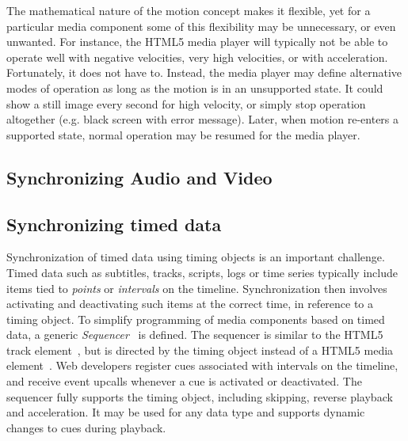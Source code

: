 \label{sec:toomuch}

The mathematical nature of the motion concept makes it flexible, yet for a
particular media component some of this flexibility may be unnecessary, or
even unwanted. For instance, the HTML5 media player will typically not be able
to operate well with negative velocities, very high velocities, or with
acceleration. Fortunately, it does not have to. Instead, the media player may
define alternative modes of operation as long as the motion is in an
unsupported state. It could show a still image every second for high velocity,
or simply stop operation altogether (e.g. black screen with error message).
Later, when motion re-enters a supported state, normal operation may be
resumed for the media player.


\subsection{Synchronizing Audio and Video}
\label{sec:avsync}




\subsection{Synchronizing timed data}
\label{sec:sequencer}

Synchronization of timed data using timing objects is an important challenge.
Timed data such as subtitles, tracks, scripts, logs or time series typically
include items tied to \emph{points} or \emph{intervals} on the timeline.
Synchronization then involves activating and deactivating such items at the
correct time, in reference to a timing object. To simplify programming of
media components based on timed data, a generic
\emph{Sequencer}~\cite{sequencer} is defined. The sequencer is similar to the
HTML5 track element~\cite{html5track}, but is directed by the timing object
instead of a HTML5 media element~\cite{html5media}. Web developers register cues associated with
intervals on the timeline, and receive event upcalls whenever a cue is
activated or deactivated. The sequencer fully supports the timing object,
including skipping, reverse playback and acceleration. It may be used for any
data type and supports dynamic changes to cues during playback.

